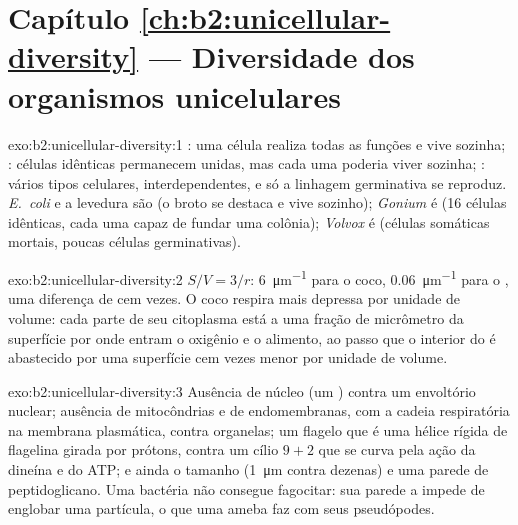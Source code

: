 \section*{Capítulo \ref{ch:b2:unicellular-diversity} --- Diversidade dos organismos unicelulares}

\begin{solution}{exo:b2:unicellular-diversity:1}
: uma célula realiza todas as funções e vive sozinha;
: células idênticas permanecem unidas, mas cada uma poderia
viver sozinha; : vários tipos celulares, interdependentes,
e só a linhagem germinativa se reproduz. \emph{E.~coli} e a levedura
são  (o broto se destaca e vive sozinho); \emph{Gonium} é
 (16 células idênticas, cada uma capaz de fundar uma colônia);
\emph{Volvox} é  (células somáticas mortais, poucas
células germinativas).
\end{solution}

\begin{solution}{exo:b2:unicellular-diversity:2}
$S/V = 3/r$: \qty{6}{\micro m^{-1}} para o coco,
\qty{0.06}{\micro m^{-1}} para o , uma diferença de cem vezes.
O coco respira mais depressa por unidade de volume: cada parte de seu
citoplasma está a uma fração de micrômetro da superfície por onde
entram o oxigênio e o alimento, ao passo que o interior do  é
abastecido por uma superfície cem vezes menor por unidade de volume.
\end{solution}

\begin{solution}{exo:b2:unicellular-diversity:3}
Ausência de núcleo (um ) contra um envoltório nuclear;
ausência de mitocôndrias e de endomembranas, com a cadeia respiratória
na membrana plasmática, contra organelas; um flagelo que é uma hélice
rígida de flagelina girada por prótons, contra um cílio $9+2$ que se
curva pela ação da dineína e do ATP; e ainda o tamanho
(\qty{1}{\micro m} contra dezenas) e uma parede de peptidoglicano. Uma
bactéria não consegue fagocitar: sua parede a impede de englobar uma
partícula, o que uma ameba faz com seus pseudópodes.
\end{solution}


